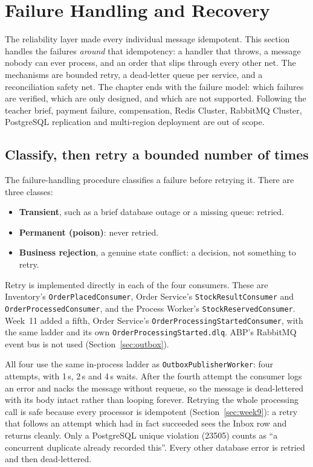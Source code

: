 \documentclass[a4paper]{report}
\begin{document}
\section{Failure Handling and Recovery}
\label{sec:week10}

The reliability layer made every individual message idempotent. This section handles the
failures \emph{around} that idempotency: a handler that throws, a message
nobody can ever process, and an order that slips through every other net.
The mechanisms are bounded retry, a dead-letter queue per service, and a
reconciliation safety net. The chapter ends with the failure model: which
failures are verified, which are only designed, and which are not supported.
Following the teacher brief, payment failure, compensation, Redis Cluster,
RabbitMQ Cluster, PostgreSQL replication and multi-region deployment are out
of scope.

\subsection{Classify, then retry a bounded number of times}

The failure-handling procedure classifies a failure before retrying it.
There are three classes:
\begin{itemize}
  \item \textbf{Transient}, such as a brief database outage or a missing
    queue: retried.
  \item \textbf{Permanent (poison)}: never retried.
  \item \textbf{Business rejection}, a genuine state conflict: a decision,
    not something to retry.
\end{itemize}
Retry is implemented directly in each of the four consumers. These are
Inventory's \texttt{OrderPlacedConsumer}, Order Service's
\texttt{StockResultConsumer} and \texttt{OrderProcessedConsumer}, and the Process Worker's \texttt{StockReservedConsumer}. Week~11 added a fifth, Order Service's \texttt{OrderProcessingStartedConsumer}, with the same ladder and its own \texttt{OrderProcessingStarted.dlq}. ABP's RabbitMQ event bus is
not used (Section~\ref{sec:outbox}).

All four use the same in-process ladder as \texttt{OutboxPublisherWorker}:
four attempts, with 1\,s, 2\,s and 4\,s waits. After the fourth attempt the
consumer logs an error and nacks the message without requeue, so the message
is dead-lettered with its body intact rather than looping forever. Retrying
the whole processing call is safe because every processor is idempotent
(Section~\ref{sec:week9}): a retry that follows an attempt which had in fact succeeded sees
the Inbox row and returns cleanly. Only a PostgreSQL unique violation (23505)
counts as ``a concurrent duplicate already recorded this''. Every other
database error is retried and then dead-lettered.
\end{document}
